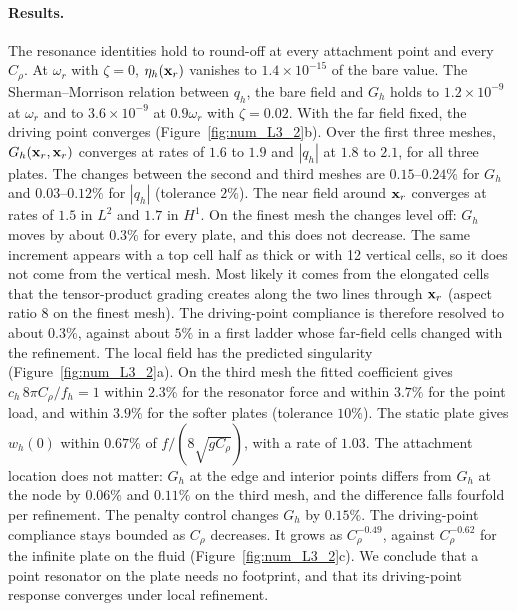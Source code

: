 {\paragraph{Results.} The resonance identities hold to round-off at every attachment point and every $C_\rho$. At $\omega_r$ with $\zeta=0$, $\eta_h(\mathbf{x}_r)$ vanishes to $1.4\times10^{-15}$ of the bare value. The Sherman--Morrison relation between $q_h$, the bare field and $G_h$ holds to $1.2\times10^{-9}$ at $\omega_r$ and to $3.6\times10^{-9}$ at $0.9\omega_r$ with $\zeta=0.02$. With the far field fixed, the driving point converges (Figure~\ref{fig:num_L3_2}b). Over the first three meshes, $G_h(\mathbf{x}_r,\mathbf{x}_r)$ converges at rates of $1.6$ to $1.9$ and $|q_h|$ at $1.8$ to $2.1$, for all three plates. The changes between the second and third meshes are $0.15$--$0.24\%$ for $G_h$ and $0.03$--$0.12\%$ for $|q_h|$ (tolerance $2\%$). The near field around $\mathbf{x}_r$ converges at rates of $1.5$ in $L^2$ and $1.7$ in $H^1$. On the finest mesh the changes level off: $G_h$ moves by about $0.3\%$ for every plate, and this does not decrease. The same increment appears with a top cell half as thick or with 12 vertical cells, so it does not come from the vertical mesh. Most likely it comes from the elongated cells that the tensor-product grading creates along the two lines through $\mathbf{x}_r$ (aspect ratio $8$ on the finest mesh). The driving-point compliance is therefore resolved to about $0.3\%$, against about $5\%$ in a first ladder whose far-field cells changed with the refinement. The local field has the predicted singularity (Figure~\ref{fig:num_L3_2}a). On the third mesh the fitted coefficient gives $c_h\,8\pi C_\rho/f_h=1$ within $2.3\%$ for the resonator force and within $3.7\%$ for the point load, and within $3.9\%$ for the softer plates (tolerance $10\%$). The static plate gives $w_h(0)$ within $0.67\%$ of $f/(8\sqrt{gC_\rho})$, with a rate of $1.03$. The attachment location does not matter: $G_h$ at the edge and interior points differs from $G_h$ at the node by $0.06\%$ and $0.11\%$ on the third mesh, and the difference falls fourfold per refinement. The penalty control changes $G_h$ by $0.15\%$. The driving-point compliance stays bounded as $C_\rho$ decreases. It grows as $C_\rho^{-0.49}$, against $C_\rho^{-0.62}$ for the infinite plate on the fluid (Figure~\ref{fig:num_L3_2}c). We conclude that a point resonator on the plate needs no footprint, and that its driving-point response converges under local refinement.

}
